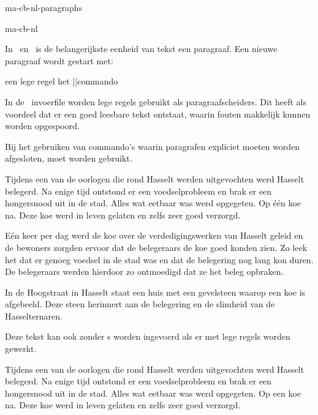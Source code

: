 \startonderdeel ma-cb-nl-paragraphs

\produkt ma-cb-nl





In \TEX\ en \CONTEXT\ is de belangerijkste eenheid van tekst
een paragraaf. Een nieuwe paragraaf wordt gestart met:

\startopsomming[opelkaar]
\som een lege regel
\som het \TEX||commando \type{\par}
\stopopsomming

In de \ASCII\ invoerfile worden lege regels gebruikt als
paragraafscheiders. Dit heeft als voordeel dat er een goed
leesbare tekst ontstaat, waarin fouten makkelijk kunnen
worden opgespoord.

Bij het gebruiken van commando's waarin paragrafen expliciet
moeten worden afgesloten, moet \type{\par} worden gebruikt.

\startbuffer
Tijdens een van de oorlogen die rond Hasselt werden
uitgevochten werd Hasselt belegerd. Na enige tijd ontstond er
een voedselprobleem en brak er een hongersnood uit in de
stad. Alles wat eetbaar was werd opgegeten. Op \'e\'en koe na.
Deze koe werd in leven gelaten en zelfs zeer goed
verzorgd.\par
E\'en keer per dag werd de koe over de verdedigingswerken van
Hasselt geleid en de bewoners zorgden ervoor dat de
belegeraars de koe goed konden zien. Zo leek het dat er
genoeg voedsel in de stad was en dat de belegering nog lang
kon duren. De belegeraars werden hierdoor zo ontmoedigd dat
ze het beleg opbraken.\par
In de Hoogstraat in Hasselt staat een huis met een gevelsteen
waarop een koe is afgebeeld. Deze steen herinnert aan de
belegering en de slimheid van de Hasselternaren.
\stopbuffer

\typebuffer

Deze tekst kan ook zonder \type{\par}s worden ingevoerd als
er met lege regels worden gewerkt.

\startbuffer
Tijdens een van de oorlogen die rond Hasselt werden
uitgevochten werd Hasselt belegerd. Na enige tijd ontstond er
een voedselprobleem en brak er een hongersnood uit in de
stad. Alles wat eetbaar was werd opgegeten. Op een koe na.
Deze koe werd in leven gelaten en zelfs zeer goed verzorgd.

